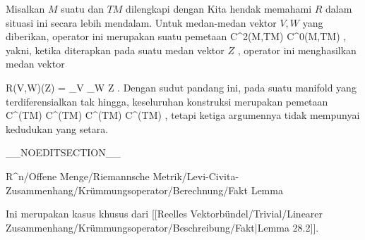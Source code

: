 \setcounter{section}{29}


Misalkan $M$ suatu
dan
$TM$ dilengkapi dengan
Kita hendak memahami
$R$ dalam situasi ini secara lebih mendalam. Untuk medan-medan vektor $V,W$ yang diberikan, operator ini merupakan suatu pemetaan
 { C^2(M,TM) } { C^0(M,TM)
} {,}
yakni, ketika diterapkan pada suatu medan vektor $Z$
 {} {,}
operator ini menghasilkan medan vektor

\mavergleichskettedisp
{\vergleichskette
{ R(V,W)(Z)
}
{ =} { \nabla_V \nabla_W Z
}
{ } {
}
{ } {
}
{ } {
}
}
{}{}{.}
Dengan sudut pandang ini, pada suatu manifold yang terdiferensialkan tak hingga, keseluruhan konstruksi merupakan pemetaan
\maabbdisp {} {C^\infty(TM) \times C^\infty(TM) \times C^\infty(TM)  } { C^\infty(TM)
} {,}
tetapi ketiga argumennya tidak mempunyai kedudukan yang setara.

__NOEDITSECTION__

{R^n/Offene Menge/Riemannsche Metrik/Levi-Civita-Zusammenhang/Krümmungsoperator/Berechnung/Fakt}
{Lemma}
{}
{

\faktzusatz {}
\faktzusatz {}

}
{

Ini merupakan kasus khusus dari
[[Reelles Vektorbündel/Trivial/Linearer Zusammenhang/Krümmungsoperator/Beschreibung/Fakt|Lemma 28.2]].

}

